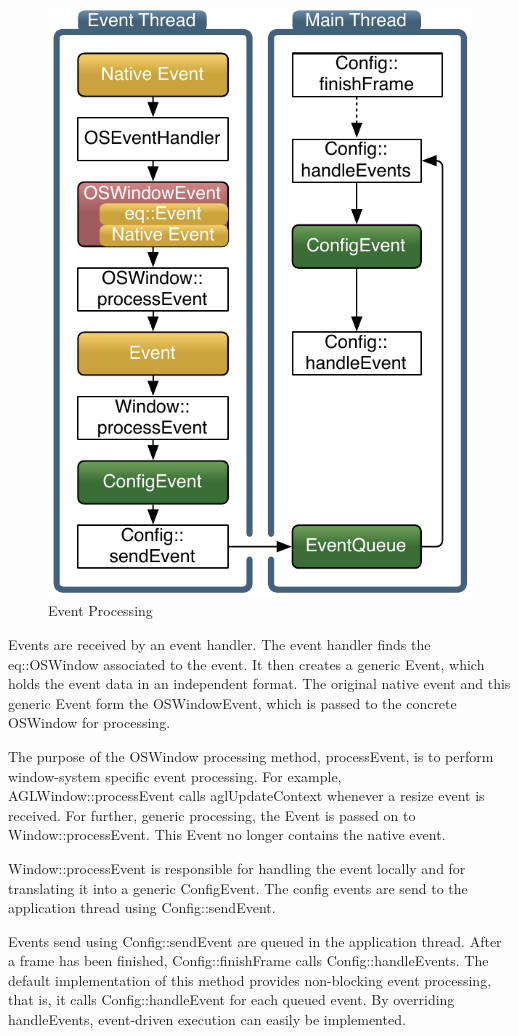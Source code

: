\documentclass[10pt,a4]{scrartcl}
\begin{document}
\begin{figure}
\vspace{-2ex}
  \includegraphics[width=.382\textwidth]{images/eventFilter.pdf}
  {\caption{\label{fEventProcessing}Event Processing}}
\vspace{-4ex}
\end{figure}
Events are received by an event handler. The event handler finds the
\textsf{eq::OSWindow} associated to the event. It then creates a generic
\textsf{Event}, which holds the event data in an independent
format. The original native event and this generic \textsf{Event}
form the \textsf{OSWindowEvent}, which is passed to the concrete
\textsf{OSWindow} for processing.

The purpose of the \textsf{OSWindow} processing method,
\textsf{processEvent}, is to perform window-system specific event
processing. For example, \textsf{AGLWindow::processEvent} calls
\textsf{aglUpdateContext} whenever a resize event is received. For
further, generic processing, the \textsf{Event} is passed on to
\textsf{Window::processEvent}. This \textsf{Event} no longer contains
the native event.

\textsf{Window::processEvent} is responsible for handling
the event locally and for translating it into a generic
\textsf{ConfigEvent}. The config events are send to the application
thread using \textsf{Config::sendEvent}. 

Events send using \textsf{Config::sendEvent} are queued in the
application thread. After a frame has been finished,
\textsf{Config::finishFrame} calls \textsf{Config::handleEvents}. The
default implementation of this method provides non-blocking event
processing, that is, it calls \textsf{Config::handleEvent} for each
queued event. By overriding \textsf{handleEvents}, event-driven
execution can easily be implemented.
\end{document}

